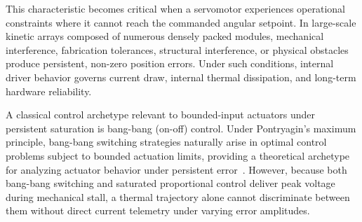 \documentclass[lettersize,journal]{IEEEtran}
\begin{document}
	This characteristic becomes critical when a servomotor experiences operational constraints where it cannot reach the commanded angular setpoint. In large-scale kinetic arrays composed of numerous densely packed modules, mechanical interference, fabrication tolerances, structural interference, or physical obstacles produce persistent, non-zero position errors. Under such conditions, internal driver behavior governs current draw, internal thermal dissipation, and long-term hardware reliability.
	
	A classical control archetype relevant to bounded-input actuators under persistent saturation is bang-bang (on-off) control. Under Pontryagin's maximum principle, bang-bang switching strategies naturally arise in optimal control problems subject to bounded actuation limits, providing a theoretical archetype for analyzing actuator behavior under persistent error~\cite{kirk2004optimal}. However, because both bang-bang switching and saturated proportional control deliver peak voltage during mechanical stall, a thermal trajectory alone cannot discriminate between them without direct current telemetry under varying error amplitudes.
	
\end{document}
